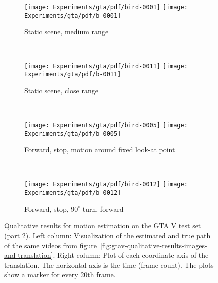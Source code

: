 		
		\begin{figure}[h]
			\centering
			\begin{subfigure}[b]{\linewidth}
				\centering
				\texttt{[image: Experiments/gta/pdf/bird-0001]}
				\texttt{[image: Experiments/gta/pdf/b-0001]}
				\caption{
					Static scene, medium range
					\label{fig:gtav-qualitative-long-range}
				}
			\end{subfigure}%
			\\
			\begin{subfigure}[b]{\linewidth}
				\centering
				\texttt{[image: Experiments/gta/pdf/bird-0011]}
				\texttt{[image: Experiments/gta/pdf/b-0011]}
				\caption{
					Static scene, close range
					\label{fig:gtav-qualitative-close-range}
				}
			\end{subfigure}%
			\\
			\begin{subfigure}[b]{\linewidth}
				\centering
				\texttt{[image: Experiments/gta/pdf/bird-0005]}
				\texttt{[image: Experiments/gta/pdf/b-0005]}
				\caption{
					Forward, stop, motion around fixed look-at point
					\label{fig:gtav-qualitative-look-at-fixed}
				}
			\end{subfigure}%
			\\
			\begin{subfigure}[b]{\linewidth}
				\centering
				\texttt{[image: Experiments/gta/pdf/bird-0012]}
				\texttt{[image: Experiments/gta/pdf/b-0012]}
				\caption{
					Forward, stop, $90^\circ$ turn, forward
					\label{fig:gtav-qualitative-sharp-turn}
				}
			\end{subfigure}%
			\caption[Qualitative results for motion estimation on GTA V - Part 2]
					{Qualitative results for motion estimation on the GTA V test set (part 2).
					 Left column: Visualization of the estimated and true path of the same videos from figure~\ref{fig:gtav-qualitative-results-images-and-translation}.
					 Right column: Plot of each coordinate axis of the translation.
					 The horizontal axis is the time (frame count).
					 The plots show a marker for every 20th frame.
					 \label{fig:gtav-qualitative-results-translation}}
		\end{figure}
	
		
		
